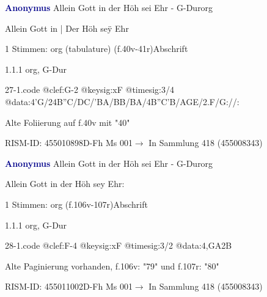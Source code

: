 \documentclass[twocolumn, 12pt]{book}
\begin{document}
\par \vspace{16pt} \textcolor{darkblue}{\textbf{Anonymus  }}\hfillplus{\textbf{[27]}}\newline Allein Gott in der Höh sei Ehr - G-Dur\newline org
\par \begin{itshape}[f.40v, at left:] Allein Gott in | Der Höh seÿ Ehr\end{itshape} 
\par \textcolor{darkblue}{}  1 Stimmen: org (tabulature)  (f.40v-41r)\newline Abschrift
\par 1.1.1  org, G-Dur  
\begin{filecontents*}{27-1.code}
@clef:G-2
@keysig:xF
@timesig:3/4
@data:4'G/24B''C/DC/'BA/BB/BA/4B''C'B/AGE/2.F/G://:
\end{filecontents*}
\newline %
\par Alte Foliierung auf f.40v mit "40"
\par RISM-ID: 455010898\newline D-Fh  Ms 001\newline $\rightarrow$ In Sammlung 418 (455008343)
      
\par \vspace{16pt} \textcolor{darkblue}{\textbf{Anonymus  }}\hfillplus{\textbf{[28]}}\newline Allein Gott in der Höh sei Ehr - G-Dur\newline org
\par \begin{itshape}[f.106v, heading:] Allein Gott in der Höh sey Ehr:\end{itshape} 
\par \textcolor{darkblue}{}  1 Stimmen: org  (f.106v-107r)\newline Abschrift
\par 1.1.1  org, G-Dur  
\begin{filecontents*}{28-1.code}
@clef:F-4
@keysig:xF
@timesig:3/2
@data:4,GA2B%
\end{filecontents*}
\newline %
\par Alte Paginierung vorhanden, f.106v: "79" und f.107r: "80"
\par RISM-ID: 455011002\newline D-Fh  Ms 001\newline $\rightarrow$ In Sammlung 418 (455008343)
      
\end{document}
